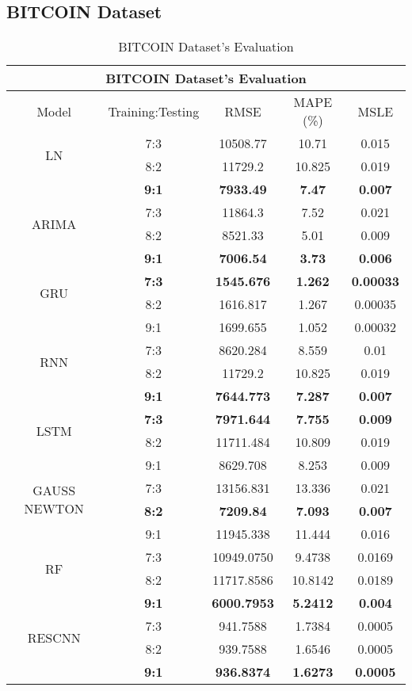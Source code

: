 \documentclass{ieeeojies}
\begin{document}
\subsection{BITCOIN Dataset} 
\begin{table}[H]
    \centering
    \begin{tabular}{|c|c|c|c|c|}
         \hline
         \multicolumn{5}{|c|}{\textbf{BITCOIN Dataset's Evaluation}}\\
         \hline
         \centering Model & Training:Testing & RMSE & MAPE (\%) & MSLE\\
         \hline
         \multirow{2}{*}{LN} & 7:3 & 10508.77 & 10.71 & 0.015 \\ & 8:2 & 11729.2 & 10.825 & 0.019 \\ & \textbf{9:1} & \textbf{7933.49} & \textbf{7.47} & \textbf{0.007}\\
         \hline
         \multirow{2}{*}{ARIMA} & 7:3&11864.3&7.52&0.021\\ & 8:2&8521.33&5.01&0.009 \\ & \textbf{9:1} & \textbf{7006.54} & \textbf{3.73} & \textbf{0.006}\\
         \hline
         \multirow{2}{*}{GRU} & \textbf{7:3}	& \textbf{1545.676} & \textbf{1.262} & \textbf{0.00033} \\ & 8:2 & 1616.817 & 1.267 & 0.00035 \\ & 9:1 & 1699.655  & 1.052 & 0.00032\\
         \hline
         \multirow{2}{*}{RNN} & 7:3 &  8620.284 &  8.559 & 0.01 \\ & 8:2 &  11729.2 & 10.825 & 0.019 \\ & \textbf{9:1} & \textbf{7644.773}  & \textbf{7.287} & \textbf{0.007}\\
         \hline
         \multirow{2}{*}{LSTM} & \textbf{7:3}	& \textbf{7971.644} & \textbf{7.755} & \textbf{0.009} \\ & 8:2 & 11711.484 & 10.809 & 0.019 \\ & 9:1 & 8629.708 & 8.253 & 0.009\\
         \hline
         \multirow{2}{*}{GAUSS NEWTON} & 7:3 & 13156.831&13.336 & 0.021 \\ & \textbf{8:2} &	\textbf{7209.84} & \textbf{7.093} & \textbf{0.007} \\ & 9:1 &11945.338	&11.444&0.016\\
         \hline
         \multirow{2}{*}{RF} & 7:3 & 10949.0750 & 9.4738 & 0.0169 \\ & 8:2 & 11717.8586 &10.8142 & 0.0189 \\ & \textbf{9:1} &  	\textbf{6000.7953} &	\textbf{5.2412} & 	\textbf{0.004} \\
         \hline
         \multirow{2}{*}{RESCNN} & 7:3 & 941.7588 &  1.7384 &  0.0005 \\ & 8:2 & 939.7588 &  1.6546 &  0.0005 \\ & \textbf{9:1} & \textbf{936.8374} & \textbf{1.6273} & \textbf{0.0005}\\
         \hline
    \end{tabular}
    \caption{BITCOIN Dataset's Evaluation}
    \label{vcbresult}
\end{table}
\end{document}
